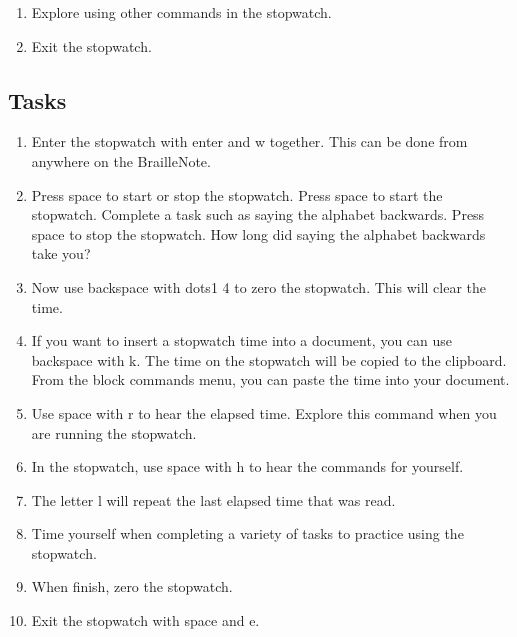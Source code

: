\documentclass[10pt,letterpaper,twoside]{report}
\begin{document}
{{{{\begin{enumerate}
	\item Explore using other commands in the stopwatch.
	      
	\item Exit the stopwatch.
\end{enumerate}



 \subsection{Tasks}



\begin{enumerate}
	\item Enter the stopwatch with enter and w together.  This can be done from anywhere on the BrailleNote.
	      
	\item Press space to start or stop the stopwatch.  Press space to start the stopwatch.  Complete a task such as saying the alphabet backwards.  Press space to stop the stopwatch.  How long did saying the alphabet backwards take you?
	      
	\item Now use backspace with dots1 4 to zero the stopwatch.  This will clear the time.
	      
	\item If you want to insert a stopwatch time into a document, you can use backspace with k.  The time on the stopwatch will be copied to the clipboard.  From the block commands menu, you can paste the time into your document.
	      
	\item Use space with r to hear the elapsed time.  Explore this command when you are running the stopwatch.
	      
	\item In the stopwatch, use space with h to hear the commands for yourself.
	      
	\item The letter l will repeat the last elapsed time that was read.
	      
	\item Time yourself when completing a variety of tasks to practice using the stopwatch.
	      
	\item When finish, zero the stopwatch.
	      
	\item Exit the stopwatch with space and e.
\end{enumerate}





}}}}
\end{document}
